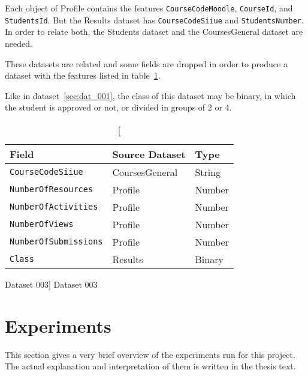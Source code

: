 Each object of Profile contains the features \texttt{CourseCodeMoodle},
\texttt{CourseId}, and \texttt{StudentsId}. But the Results dataset has
\texttt{CourseCodeSiiue} and \texttt{StudentsNumber}. In order to relate both,
the Students dataset and the CoursesGeneral dataset are needed.

These datasets are related and some fields are dropped in order to produce a
dataset with the features listed in table~\ref{tab:dat_003}.

Like in dataset~\ref{sec:dat_001}, the class of this dataset may be binary, in
which the student is approved or not, or divided in groups of 2 or 4.

\begin{table}[h!]
    \centering

    \begin{tabular}{| l | l | l |}
        \hline
        \textbf{Field}               & \textbf{Source Dataset} & \textbf{Type} \\ \hline
        \texttt{CourseCodeSiiue}     & CoursesGeneral          & String        \\ \hline
        \texttt{NumberOfResources}   & Profile                 & Number        \\ \hline
        \texttt{NumberOfActivities}  & Profile                 & Number        \\ \hline
        \texttt{NumberOfViews}       & Profile                 & Number        \\ \hline
        \texttt{NumberOfSubmissions} & Profile                 & Number        \\ \hline
        \texttt{Class}               & Results                 & Binary        \\ \hline
    \end{tabular}

    \caption
        [Dataset 003]
        {Dataset 003}

    \label{tab:dat_003}
\end{table}

\section{Experiments}

This section gives a very brief overview of the experiments run for this
project. The actual explanation and interpretation of them is written in the
thesis text.

